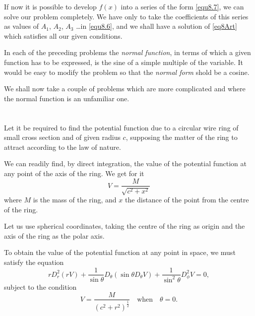 \documentclass[oneside,12pt]{book}
\begin{document}
If now it is possible to develop $f(x)$ into a series of the form \eqref{equ8.7}, we can solve our problem completely. We have only to take the coefficients of this series as values of $A_1$, $A_2$, $A_3$ \dots in \eqref{equ8.6}, and we shall have a solution of \eqref{eq8Art} which satisfies all our given conditions. \par 

In each of the preceding problems the \textit{normal function}, in terms of which a given function has to be expressed, is the sine of a simple multiple of the variable. It would be easy to modify the problem so that the \textit{normal form} shold be a cosine. \par 

We shall now take a couple of problems which are more complicated and where the normal function is an unfamiliar one. \par 

\section{} Let it be required to find the potential function due to a circular wire ring of small cross section and of given radius $c$, supposing the matter of the ring to attract according to the law of nature. \par 

We can readily find, by direct integration, the value of the potential function at any point of the axis of the ring. We get for it 
\setcounter{equation}{0}
\begin{equation}
    V=\frac{M}{\sqrt{c^2+x^2}}
    \label{eq9.1}
\end{equation}
where $M$ is the mass of the ring, and $x$ the distance of the point from the centre of the ring. \par 

Let us use spherical coordinates, taking the centre of the ring as origin and the axis of the ring as the polar axis. \par 

To obtain the value of the potential function at any point in space, we must satisfy the equation
\begin{equation}
    \label{equ8Art}
    \tag{XIII Art. 1}
    rD_r^2(rV)+\frac{1}{\sin\theta}D_\theta(\sin\theta D_\theta V)+\frac{1}{\sin^2\theta}D_\phi^2 V=0,
\end{equation}
subject to the condition
\setcounter{equation}{0}
\begin{equation}
    V=\frac{M}{(c^2+r^2)^{\frac{1}{2}}} \quad \text{when}\quad\theta=0.
\end{equation} \par 
\end{document}

